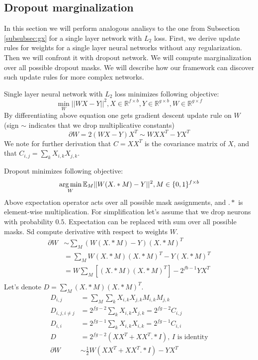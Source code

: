 \subsection{Dropout marginalization}\label{sec:dropout}
In this section we will perform analogous analisys to the one from Subsection \ref{subsubsec:gx} 
for a single layer network with $L_2$ loss. 
First, we derive update rules for weights for a single layer neural networks without any regularization. Then
we will confront it with dropout network. We will compute marginalization over
all possible dropout masks.
We will describe how our framework can discover
such update rules for more complex networks.

Single layer neural network with $L_2$ loss minimizes following objective:
\begin{equation*}
  \min_W ||WX - Y||^2, X \in \mathbb{R}^{f \times b}, Y \in \mathbb{R}^{g \times b}, W \in \mathbb{R}^{g \times f}
\end{equation*}
By differentiating above equation one gets gradient descent update rule
on $W$ (sign $\sim$ indicates that we drop multiplicative constants)
\begin{equation*}
 \partial W = 2(WX - Y)X^T \sim WXX^T - YX^T
\end{equation*}
We note for further derivation that $C = XX^T$ is the covariance matrix of
$X$, and that $C_{i,j} = \sum_k X_{i, k}X_{j, k}$.


Dropout minimizes following objective:
\begin{equation*}
  \operatorname*{arg\,min}_W \mathbb{E}_M ||W(X .* M) - Y||^2, M \in \{0, 1\}^{f \times b}
\end{equation*}
Above expectation operator acts over all possible mask assignments, and $.*$ is 
element-wise multiplication. For simplification
let's assume that we drop neurons with probability $0.5$. Expectation
can be replaced with sum over all possible masks. Sd compute
derivative with respect to weights $W$. 
\begin{align*}
  \partial W & \sim \sum_M (W(X .* M) - Y)(X .* M)^T \\
  & = \sum_M W(X .* M)(X .* M)^T - Y(X .* M)^T\\
  & = W\sum_M [(X .* M)(X .* M)^T] - 2^{fb - 1}YX^T\\
\end{align*}
Let's denote $D = \sum_M (X .* M)(X .* M)^T$. 
\begin{align*}
  D_{i,j} & = \sum_M \sum_k X_{i, k} X_{j, k} M_{i, k} M_{j, k} \\
  D_{i,j, i \neq j} & = 2^{fg - 2} \sum_k X_{i, k} X_{j, k} = 2^{fg - 2}C_{i, j} \\
  D_{i, i} & = 2^{fg - 1} \sum_k X_{i, k} X_{i, k} = 2^{fg - 1}C_{i, i} \\
  D & = 2^{fg - 2}(XX^T + XX^T .* I) \text {, $I$ is identity} \\
  \partial W & \sim \frac{1}{2}W (XX^T + XX^T .* I) - YX^T
\end{align*}

